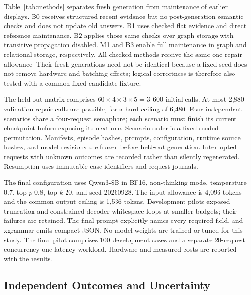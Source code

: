 \begin{table}[t]
\caption{Five matched conditions. ``Direct'' means revisiting direct references
when their evidence changes. Full maintenance includes transitive dependencies
and alternative-support evaluation.}
\label{tab:methods}
\centering\small

\end{table}

Table~\ref{tab:methods} separates fresh generation from maintenance of earlier
displays. B0 receives structured recent evidence but no post-generation semantic
checks and does not update old answers. B1 uses checked flat evidence and direct
reference maintenance. B2 applies those same checks over graph storage with
transitive propagation disabled. M1 and B3 enable full maintenance in graph and
relational storage, respectively. All checked methods receive the same one-repair
allowance. Their fresh generations need not be identical because a fixed seed
does not remove hardware and batching effects; logical correctness is therefore
also tested with a common fixed candidate fixture.

The held-out matrix comprises $60\times4\times3\times5=3{,}600$ initial calls.
At most 2,880 validation repair calls are possible, for a hard ceiling of 6,480.
Four independent scenarios share a four-request semaphore; each scenario must
finish its current checkpoint before exposing its next one. Scenario order is
a fixed seeded permutation. Manifests, episode hashes, prompts, configuration,
runtime source hashes, and model revisions are frozen before held-out generation.
Interrupted requests with unknown outcomes are recorded rather than silently
regenerated. Resumption uses immutable case identifiers and request journals.

The final configuration uses Qwen3-8B in BF16, non-thinking mode, temperature
0.7, top-$p$ 0.8, top-$k$ 20, and seed 20260928. The input allowance is 4,096
tokens and the common output ceiling is 1,536 tokens. Development pilots exposed
truncation and constrained-decoder whitespace loops at smaller budgets; their
failures are retained. The final prompt explicitly names every required field,
and xgrammar emits compact JSON. No model weights are trained or tuned for this
study. The final pilot comprises 100 development cases and a separate 20-request
concurrency-one latency workload. Hardware and measured costs are reported with
the results.

\subsection{Independent Outcomes and Uncertainty}

